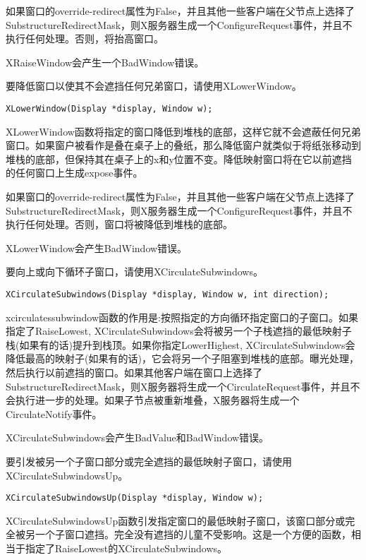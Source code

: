 如果窗口的override-redirect属性为False，并且其他一些客户端在父节点上选择了SubstructureRedirectMask，则X服务器生成一个ConfigureRequest事件，并且不执行任何处理。否则，将抬高窗口。

\noindent XRaiseWindow会产生一个BadWindow错误。

\noindent 要降低窗口以使其不会遮挡任何兄弟窗口，请使用XLowerWindow。

\begin{lstlisting}
XLowerWindow(Display *display, Window w);
\end{lstlisting}

XLowerWindow函数将指定的窗口降低到堆栈的底部，这样它就不会遮蔽任何兄弟窗口。如果窗户被看作是叠在桌子上的叠纸，那么降低窗户就类似于将纸张移动到堆栈的底部，但保持其在桌子上的x和y位置不变。降低映射窗口将在它以前遮挡的任何窗口上生成expose事件。

如果窗口的override-redirect属性为False，并且其他一些客户端在父节点上选择了SubstructureRedirectMask，则X服务器生成一个ConfigureRequest事件，并且不执行任何处理。否则，窗口将被降低到堆栈的底部。

\noindent XLowerWindow会产生BadWindow错误。

要向上或向下循环子窗口，请使用XCirculateSubwindows。
\begin{lstlisting}
XCirculateSubwindows(Display *display, Window w, int direction);
\end{lstlisting}

xcirculatessubwindow函数的作用是:按照指定的方向循环指定窗口的子窗口。如果指定了RaiseLowest, XCirculateSubwindows会将被另一个子栈遮挡的最低映射子栈(如果有的话)提升到栈顶。如果你指定LowerHighest, XCirculateSubwindows会降低最高的映射子(如果有的话)，它会将另一个子阻塞到堆栈的底部。曝光处理，然后执行以前遮挡的窗口。如果其他客户端在窗口上选择了SubstructureRedirectMask，则X服务器将生成一个CirculateRequest事件，并且不会执行进一步的处理。如果子节点被重新堆叠，X服务器将生成一个CirculateNotify事件。

\noindent XCirculateSubwindows会产生BadValue和BadWindow错误。

要引发被另一个子窗口部分或完全遮挡的最低映射子窗口，请使用XCirculateSubwindowsUp。
\begin{lstlisting}
XCirculateSubwindowsUp(Display *display, Window w);
\end{lstlisting}

XCirculateSubwindowsUp函数引发指定窗口的最低映射子窗口，该窗口部分或完全被另一个子窗口遮挡。完全没有遮挡的儿童不受影响。这是一个方便的函数，相当于指定了RaiseLowest的XCirculateSubwindows。

